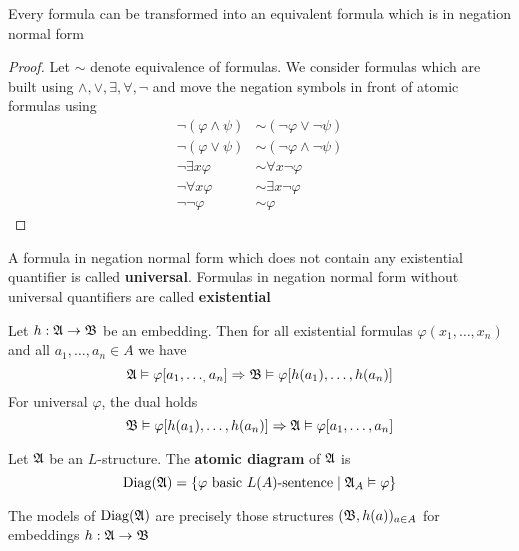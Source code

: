 \documentclass[11pt]{article}
\begin{document}
\begin{lemma}[]
Every formula can be transformed into an equivalent formula which is in negation normal form
\end{lemma}

\begin{proof}
Let \(\sim\) denote equivalence of formulas. We consider formulas which are built
using \(\wedge,\vee,\exists,\forall,\neg\) and move the negation symbols in front of atomic formulas using
\begin{align*}
\neg(\varphi\wedge\psi)&\sim(\neg\varphi\vee\neg\psi)\\
\neg(\varphi\vee\psi)&\sim(\neg\varphi\wedge\neg\psi)\\
\neg\exists x\varphi&\sim\forall x\neg\varphi\\
\neg\forall x\varphi&\sim\exists x\neg\varphi\\
\neg\neg\varphi&\sim\varphi
\end{align*}
\end{proof}

\begin{definition}[]
A formula in negation normal form which does not contain any existential
quantifier is called \textbf{universal}. Formulas in negation normal form without
universal quantifiers are called \textbf{existential}
\end{definition}

\begin{lemma}[]
\label{lemma1.2.16}
Let \(h:\mathfrak{A}\to\mathfrak{B}\) be an embedding. Then for all existential formulas \(\varphi(x_1,\dots,x_n)\) and
all \(a_1,\dots,a_n\in A\) we have
\begin{equation*}
\mathfrak{A}\vDash\varphi[a_1,\dots_,a_n]\Rightarrow\mathfrak{B}\vDash\varphi[h(a_1),\dots,h(a_n)]
\end{equation*}
For universal \(\varphi\), the dual holds
\begin{equation*}
\mathfrak{B}\vDash\varphi[h(a_1),\dots,h(a_n)]\Rightarrow
\mathfrak{A}\vDash\varphi[a_1,\dots,a_n]
\end{equation*}
\end{lemma}


Let \(\mathfrak{A}\) be an \(L\)-structure. The \textbf{atomic diagram} of \(\mathfrak{A}\) is
\begin{equation*}
\operatorname{Diag}(\mathfrak{A})=\{\varphi\text{ basic $L(A)$-sentence}\mid\mathfrak{A}_A\vDash\varphi\}
\end{equation*}

\begin{lemma}[]
The models of \(\operatorname{Diag}(\mathfrak{A})\) are precisely those structures
\((\mathfrak{B},h(a))_{a\in A}\) for embeddings \(h:\mathfrak{A}\to\mathfrak{B}\)
\end{lemma}
\end{document}

